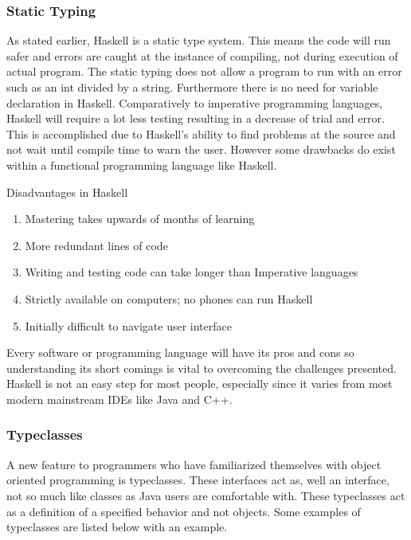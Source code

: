 \documentclass{article}
\begin{document}
    \subsubsection{Static Typing}
    As stated earlier, Haskell is a static type system. This means the code will run safer and errors are caught at the instance of compiling, not during execution of actual program. The static typing does not allow a program to run with an error such as an int divided by a string. Furthermore there is no need for variable declaration in Haskell. Comparatively to imperative programming languages, Haskell will require a lot less testing resulting in a decrease of trial and error. This is accomplished due to Haskell's ability to find problems at the source and not wait until compile time to warn the user. However some drawbacks do exist within a functional programming language like Haskell. 
    
    \medskip
    \caption{Disadvantages in Haskell}
       \begin{enumerate}
           \item Mastering takes upwards of months of learning
           \item More redundant lines of code
           \item Writing and testing code can take longer than Imperative languages
           \item Strictly available on computers; no phones can run Haskell
           \item Initially difficult to navigate user interface 
        \end{enumerate}
        
    \noindent Every software or programming language will have its pros and cons so understanding its short comings is vital to overcoming the challenges presented. Haskell is not an easy step for most people, especially since it varies from most modern mainstream IDEs like Java and C++. 
    
    \subsubsection{Typeclasses}
    A new feature to programmers who have familiarized themselves with object oriented programming is typeclasses. These interfaces act as, well an interface, not so much like classes as Java users are comfortable with. These typeclasses act as a definition of a specified behavior and not objects. Some examples of typeclasses are listed below with an example.
    \medskip
    
\end{document}
